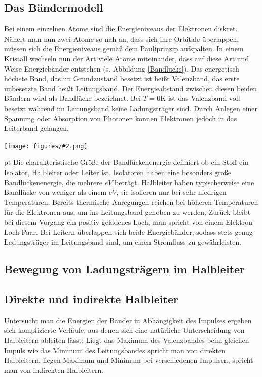 \documentclass[12pt]{article}
\newcommand{\gra}[3][0.7]{
	\begin{minipage}[h!]{\textwidth}
		\centering
		\texttt{[image: figures/\#2.png]}
		\captionof{figure}{#3}
	\end{minipage}
	\vskip 30 pt
	}
\begin{document}
\subsection{Das Bändermodell}

Bei einem einzelnen Atome sind die Energieniveaus der Elektronen diskret. Nähert man nun zwei Atome so nah an, dass sich ihre Orbitale überlappen, müssen sich die Energieniveaus gemäß dem Pauliprinzip aufspalten. In einem Kristall wechseln nun der Art viele Atome miteinander, dass auf diese Art und Weise Energiebänder entstehen (s. Abbildung \ref{Bandlucke}). Das energetisch höchste Band, das im Grundzustand besetzt ist heißt Valenzband, das erste unbesetzte Band heißt Leitungsband. Der Energieabstand zwischen diesen beiden Bändern wird als Bandlücke bezeichnet. Bei $T = 0$K ist das Valenzband voll besetzt während im Leitungsband keine Ladungsträger sind. Durch Anlegen einer Spannung oder Absorption von Photonen können Elektronen jedoch in das Leiterband gelangen. 

\gra{Bandlucke}{Bändermodell des Halbleiters \label{Bandlucke}} \cite{staat}
Die charakteristische Größe der Bandlückenenergie definiert ob ein Stoff ein Isolator, Halbleiter oder Leiter ist. Isolatoren haben eine besonders große Bandlückenenergie, die mehrere $eV$ beträgt. Halbleiter haben typischerweise eine Bandlücke von weniger als einem $eV$, sie isolieren nur bei sehr niedrigen Temperaturen. Bereits thermische Anregungen reichen bei höheren Temperaturen für die Elektronen aus, um ins Leitungsband gehoben zu werden, Zurück bleibt bei diesem Vorgang ein positiv geladenes Loch, man spricht von einem Elektron-Loch-Paar. Bei Leitern überlappen sich beide Energiebänder, sodass stets genug Ladungsträger im Leitungsband sind, um einen Stromfluss zu gewährleisten.

\subsection{Bewegung von Ladungsträgern im Halbleiter}



\subsection{Direkte und indirekte Halbleiter}

Untersucht man die Energien der Bänder in Abhängigkeit des Impulses ergeben sich komplizierte Verläufe, aus denen sich eine natürliche Unterscheidung von Halbleitern ableiten lässt: Liegt das Maximum des Valenzbandes beim gleichen Impuls wie das Minimum des Leitungsbandes spricht man von direkten Halbleitern, liegen Maximum und Minimum bei verschiedenen Impulsen, spricht man von indirekten Halbleitern.
\end{document}
